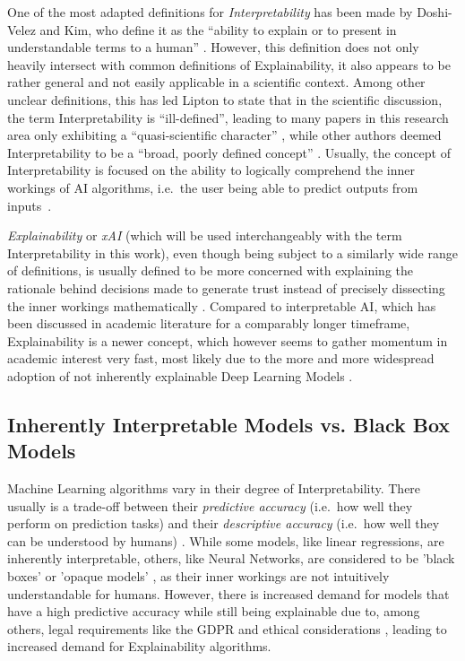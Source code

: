 One of the most adapted definitions for \textit{Interpretability} has been made by Doshi-Velez and Kim, who define it as the “ability to explain or to present in understandable terms to a human” \parencite{DoshiVelez2017}. 
However, this definition does not only heavily intersect with common definitions of Explainability, it also appears to be rather general and not easily applicable in a scientific context. 
Among other unclear definitions, this has led Lipton to state that in the scientific discussion, the term Interpretability is “ill-defined”, leading to many papers in this research area only exhibiting a “quasi-scientific character” \parencite{Lipton2018}, while other authors deemed Interpretability to be a “broad, poorly defined concept” \parencite{Murdoch2019}. 
Usually, the concept of Interpretability is focused on the ability to logically comprehend the inner workings of AI algorithms, i.e.\ the user being able to predict outputs from inputs~\parencite{Kim2016}.


\textit{Explainability} or \textit{xAI} (which will be used interchangeably with the term Interpretability in this work), even though being subject to a similarly wide range of definitions, is usually defined to be more concerned with explaining the rationale behind decisions made to generate trust instead of precisely dissecting the inner workings mathematically \parencite{Gunning2019}. 
Compared to interpretable AI, which has been discussed in academic literature for a comparably longer timeframe, Explainability is a newer concept, which however seems to gather momentum in academic interest very fast, most likely due to the more and more widespread adoption of not inherently explainable Deep Learning Models \parencite{BarredoArrieta2020}.


\subsection{Inherently Interpretable Models vs. Black Box Models}\label{subsec:inherently}

Machine Learning algorithms vary in their degree of Interpretability. There usually is a trade-off between their \textit{predictive accuracy} (i.e.\ how well they perform on prediction tasks) and their \textit{descriptive accuracy} (i.e.\ how well they can be understood by humans) \parencite{Murdoch2019}.
While some models, like linear regressions, are inherently interpretable, others, like Neural Networks, are considered to be 'black boxes' \parencite{Guidotti2018} or 'opaque models' \parencite{Burrell2016}, as their inner workings are not intuitively understandable for humans.
However, there is increased demand for models that have a high predictive accuracy while still being explainable due to, among others, legal requirements like the GDPR \parencite{GDPR} and ethical considerations \parencite{Guidotti2018}, leading to increased demand for Explainability algorithms.


